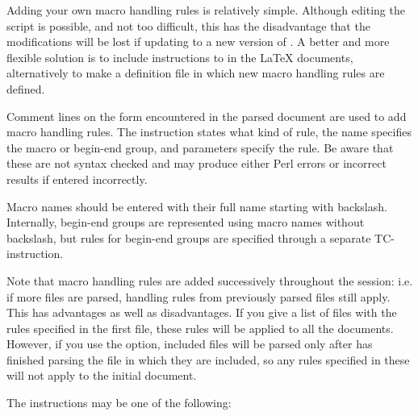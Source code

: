 \documentclass{article}
\begin{document}
Adding your own macro handling rules is relatively simple. Although editing the script is possible, and not too difficult, this has the disadvantage that the modifications will be lost if updating to a new version of \TeXcount. A better and more flexible solution is to include instructions to \TeXcount{} in the \LaTeX{} documents, alternatively to make a definition file in which new macro handling rules are defined.

Comment lines on the form
encountered in the parsed document are used to add macro handling rules. The instruction states what kind of rule, the name specifies the macro or begin-end group, and parameters specify the rule. Be aware that these are not syntax checked and may produce either Perl errors or incorrect results if entered incorrectly.

Macro names should be entered with their full name starting with backslash. Internally, begin-end groups are represented using macro names  without backslash, but rules for begin-end groups are specified through a separate TC-instruction.

Note that macro handling rules are added successively throughout the session: i.e. if more files are parsed, handling rules from previously parsed files still apply. This has advantages as well as disadvantages. If you give a list of files with the rules specified in the first file, these rules will be applied to all the documents. However, if you use the  option, included files will be parsed only after \TeXcount{} has finished parsing the file in which they are included, so any rules specified in these will not apply to the initial document.

The instructions may be one of the following:
%

\end{document}
